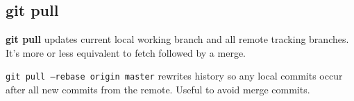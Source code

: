 %
\subsection{git pull}
\textbf{git pull} updates current local working branch  and all remote tracking branches.
It's more or less equivalent to fetch followed by a merge.

\texttt{git pull --rebase origin master} rewrites history so any local commits occur after all new commits from the remote.
Useful to avoid merge commits.

%